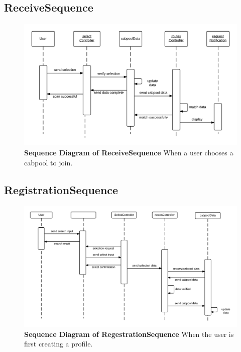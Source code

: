 \documentclass[]{article}
\begin{document}
\subsection{ReceiveSequence}

\begin{figure}[H]
\label{recSeq}
	\centering
	\includegraphics[width=1\textwidth]{ReceiveSequence.png}
	\caption{\textbf{Sequence Diagram of ReceiveSequence} When a user chooses a cabpool to join.}
\end{figure}

\subsection{RegistrationSequence}

\begin{figure}[H]
\label{regSeq}
	\centering
	\includegraphics[width=1\textwidth]{RequestSequence.png}
	\caption{\textbf{Sequence Diagram of RegestrationSequence} When the user is first creating a profile.}
\end{figure}
\end{document}
